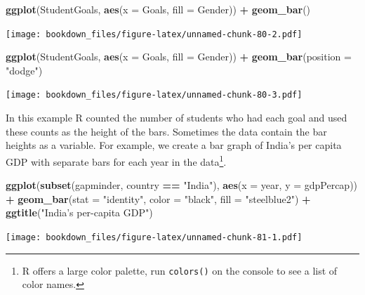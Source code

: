 \documentclass[]{krantz}
\makeatletter
\newenvironment{Shaded}{\begin{snugshade}}{\end{snugshade}}
\newcommand{\KeywordTok}[1]{\textcolor[rgb]{0.27,0.27,0.27}{\textbf{#1}}}
\newcommand{\DataTypeTok}[1]{\textcolor[rgb]{0.27,0.27,0.27}{#1}}
\newcommand{\StringTok}[1]{\textcolor[rgb]{0.5,0.5,0.5}{#1}}
\newcommand{\OperatorTok}[1]{\textcolor[rgb]{0.43,0.43,0.43}{\textbf{#1}}}
\newcommand{\NormalTok}[1]{#1}
\newenvironment{kframe}{%
\medskip{}
\setlength{\fboxsep}{.8em}
 \def\at@end@of@kframe{}%
 \ifinner\ifhmode%
  \def\at@end@of@kframe{\end{minipage}}%
  \begin{minipage}{\columnwidth}%
 \fi\fi%
 \def\FrameCommand##1{\hskip\@totalleftmargin \hskip-\fboxsep
 \colorbox{shadecolor}{##1}\hskip-\fboxsep
     \hskip-\linewidth \hskip-\@totalleftmargin \hskip\columnwidth}%
 \MakeFramed {\advance\hsize-\width
   \@totalleftmargin\z@ \linewidth\hsize
   \@setminipage}}%
 {\par\unskip\endMakeFramed%
 \at@end@of@kframe}
\renewenvironment{Shaded}{\begin{kframe}}{\end{kframe}}
\makeatother
\begin{document}
\begin{Shaded}
\begin{Highlighting}[]
\KeywordTok{ggplot}\NormalTok{(StudentGoals, }\KeywordTok{aes}\NormalTok{(}\DataTypeTok{x =}\NormalTok{ Goals, }\DataTypeTok{fill =}\NormalTok{ Gender)) }\OperatorTok{+}\StringTok{ }\KeywordTok{geom_bar}\NormalTok{()}
\end{Highlighting}
\end{Shaded}

\texttt{[image: bookdown\_files/figure-latex/unnamed-chunk-80-2.pdf]}

\begin{Shaded}
\begin{Highlighting}[]
\KeywordTok{ggplot}\NormalTok{(StudentGoals, }\KeywordTok{aes}\NormalTok{(}\DataTypeTok{x =}\NormalTok{ Goals, }\DataTypeTok{fill =}\NormalTok{ Gender)) }\OperatorTok{+}\StringTok{ }
\StringTok{    }\KeywordTok{geom_bar}\NormalTok{(}\DataTypeTok{position =} \StringTok{"dodge"}\NormalTok{)}
\end{Highlighting}
\end{Shaded}

\texttt{[image: bookdown\_files/figure-latex/unnamed-chunk-80-3.pdf]}

In this example R counted the number of students who had each goal and
used these counts as the height of the bars. Sometimes the data contain
the bar heights as a variable. For example, we create a bar graph of
India's per capita GDP with separate bars for each year in the
data\footnote{R offers a large color palette, run \texttt{colors()} on
  the console to see a list of color names.}.

\begin{Shaded}
\begin{Highlighting}[]
\KeywordTok{ggplot}\NormalTok{(}\KeywordTok{subset}\NormalTok{(gapminder, country }\OperatorTok{==}\StringTok{ "India"}\NormalTok{), }\KeywordTok{aes}\NormalTok{(}\DataTypeTok{x =}\NormalTok{ year, }\DataTypeTok{y =}\NormalTok{ gdpPercap)) }\OperatorTok{+}\StringTok{ }
\StringTok{    }\KeywordTok{geom_bar}\NormalTok{(}\DataTypeTok{stat =} \StringTok{"identity"}\NormalTok{, }\DataTypeTok{color =} \StringTok{"black"}\NormalTok{, }\DataTypeTok{fill =} \StringTok{"steelblue2"}\NormalTok{) }\OperatorTok{+}\StringTok{ }
\StringTok{    }\KeywordTok{ggtitle}\NormalTok{(}\StringTok{"India's per-capita GDP"}\NormalTok{)}
\end{Highlighting}
\end{Shaded}

\texttt{[image: bookdown\_files/figure-latex/unnamed-chunk-81-1.pdf]}
\end{document}
